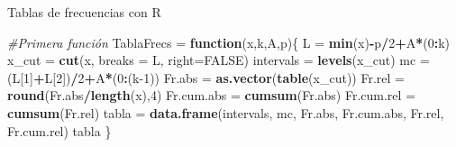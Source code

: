 \documentclass[
  ignorenonframetext,
]{beamer}
\newenvironment{Shaded}{\begin{snugshade}}{\end{snugshade}}
\newcommand{\AttributeTok}[1]{\textcolor[rgb]{0.13,0.29,0.53}{#1}}
\newcommand{\CommentTok}[1]{\textcolor[rgb]{0.56,0.35,0.01}{\textit{#1}}}
\newcommand{\ConstantTok}[1]{\textcolor[rgb]{0.56,0.35,0.01}{#1}}
\newcommand{\ControlFlowTok}[1]{\textcolor[rgb]{0.13,0.29,0.53}{\textbf{#1}}}
\newcommand{\DecValTok}[1]{\textcolor[rgb]{0.00,0.00,0.81}{#1}}
\newcommand{\FunctionTok}[1]{\textcolor[rgb]{0.13,0.29,0.53}{\textbf{#1}}}
\newcommand{\NormalTok}[1]{#1}
\newcommand{\OtherTok}[1]{\textcolor[rgb]{0.56,0.35,0.01}{#1}}
\newcommand{\SpecialCharTok}[1]{\textcolor[rgb]{0.81,0.36,0.00}{\textbf{#1}}}
\begin{document}
\begin{frame}[fragile]{Tablas de frecuencias con R}
\label{tablas-de-frecuencias-con-r}
\begin{Shaded}
\begin{Highlighting}[]
\CommentTok{\#Primera función}
\NormalTok{TablaFrecs }\OtherTok{=} \ControlFlowTok{function}\NormalTok{(x,k,A,p)\{ }
\NormalTok{  L }\OtherTok{=} \FunctionTok{min}\NormalTok{(x)}\SpecialCharTok{{-}}\NormalTok{p}\SpecialCharTok{/}\DecValTok{2}\SpecialCharTok{+}\NormalTok{A}\SpecialCharTok{*}\NormalTok{(}\DecValTok{0}\SpecialCharTok{:}\NormalTok{k)}
\NormalTok{  x\_cut }\OtherTok{=} \FunctionTok{cut}\NormalTok{(x, }\AttributeTok{breaks =}\NormalTok{ L, }\AttributeTok{right=}\ConstantTok{FALSE}\NormalTok{)}
\NormalTok{  intervals }\OtherTok{=} \FunctionTok{levels}\NormalTok{(x\_cut)}
\NormalTok{  mc }\OtherTok{=}\NormalTok{ (L[}\DecValTok{1}\NormalTok{]}\SpecialCharTok{+}\NormalTok{L[}\DecValTok{2}\NormalTok{])}\SpecialCharTok{/}\DecValTok{2}\SpecialCharTok{+}\NormalTok{A}\SpecialCharTok{*}\NormalTok{(}\DecValTok{0}\SpecialCharTok{:}\NormalTok{(k}\DecValTok{{-}1}\NormalTok{))}
\NormalTok{  Fr.abs }\OtherTok{=} \FunctionTok{as.vector}\NormalTok{(}\FunctionTok{table}\NormalTok{(x\_cut)) }
\NormalTok{  Fr.rel }\OtherTok{=} \FunctionTok{round}\NormalTok{(Fr.abs}\SpecialCharTok{/}\FunctionTok{length}\NormalTok{(x),}\DecValTok{4}\NormalTok{) }
\NormalTok{  Fr.cum.abs }\OtherTok{=} \FunctionTok{cumsum}\NormalTok{(Fr.abs) }
\NormalTok{  Fr.cum.rel }\OtherTok{=} \FunctionTok{cumsum}\NormalTok{(Fr.rel)}
\NormalTok{  tabla }\OtherTok{=} \FunctionTok{data.frame}\NormalTok{(intervals, mc, Fr.abs, Fr.cum.abs, Fr.rel, Fr.cum.rel)}
\NormalTok{  tabla}
\NormalTok{  \}}
\end{Highlighting}
\end{Shaded}
\end{frame}
\end{document}
